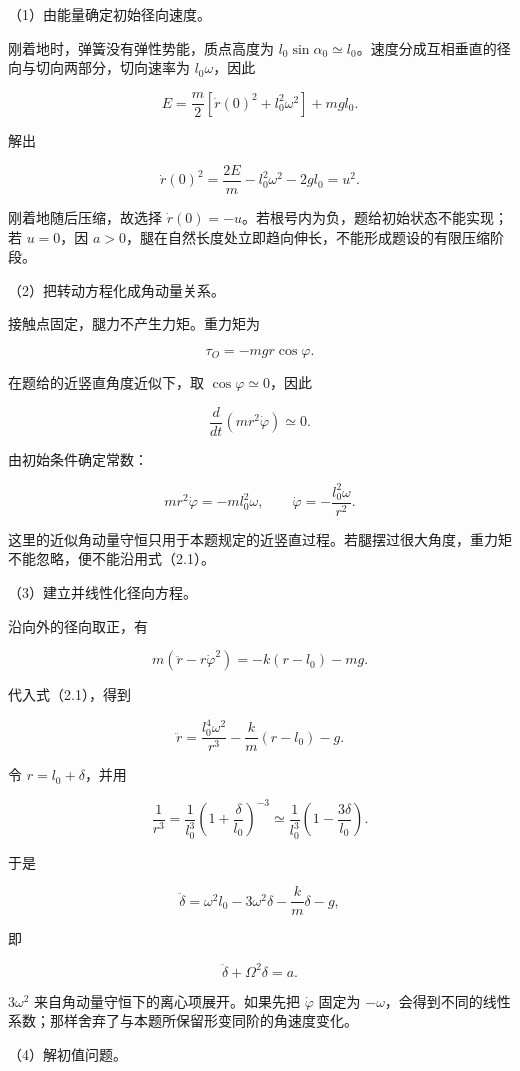\documentclass[12pt,a4paper,fontset=fandol]{ctexart}
\begin{document}
（1）由能量确定初始径向速度。

刚着地时，弹簧没有弹性势能，质点高度为
\(l_0\sin\alpha_0\simeq l_0\)。速度分成互相垂直的径向与切向两部分，切向速率为
\(l_0\omega\)，因此

\[
E=\frac{m}{2}\left[\dot r(0)^2+l_0^2\omega^2\right]+mgl_0.
\]

解出

\[
\dot r(0)^2=\frac{2E}{m}-l_0^2\omega^2-2gl_0=u^2.
\]

刚着地随后压缩，故选择
\(\dot r(0)=-u\)。若根号内为负，题给初始状态不能实现；若 \(u=0\)，因
\(a>0\)，腿在自然长度处立即趋向伸长，不能形成题设的有限压缩阶段。

（2）把转动方程化成角动量关系。

接触点固定，腿力不产生力矩。重力矩为

\[
\tau_O=-mgr\cos\varphi.
\]

在题给的近竖直角度近似下，取 \(\cos\varphi\simeq0\)，因此

\[
\frac{d}{dt}(mr^2\dot\varphi)\simeq0.
\]

由初始条件确定常数：

\[
mr^2\dot\varphi=-ml_0^2\omega,
\qquad
\dot\varphi=-\frac{l_0^2\omega}{r^2}.
\tag{2.1}
\]

这里的近似角动量守恒只用于本题规定的近竖直过程。若腿摆过很大角度，重力矩不能忽略，便不能沿用式（2.1）。

（3）建立并线性化径向方程。

沿向外的径向取正，有

\[
m(\ddot r-r\dot\varphi^2)=-k(r-l_0)-mg.
\]

代入式（2.1），得到

\[
\ddot r=\frac{l_0^4\omega^2}{r^3}-\frac{k}{m}(r-l_0)-g.
\]

令 \(r=l_0+\delta\)，并用

\[
\frac{1}{r^3}
=\frac{1}{l_0^3}\left(1+\frac{\delta}{l_0}\right)^{-3}
\simeq\frac{1}{l_0^3}\left(1-\frac{3\delta}{l_0}\right).
\]

于是

\[
\ddot\delta=\omega^2l_0-3\omega^2\delta-\frac{k}{m}\delta-g,
\]

即

\[
\ddot\delta+\Omega^2\delta=a.
\tag{2.2}
\]

\(3\omega^2\) 来自角动量守恒下的离心项展开。如果先把 \(\dot\varphi\)
固定为
\(-\omega\)，会得到不同的线性系数；那样舍弃了与本题所保留形变同阶的角速度变化。

（4）解初值问题。
\end{document}
